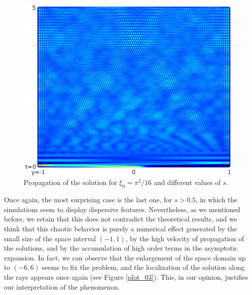 \documentclass[10pt]{article}
\begin{document}
\begin{figure}[!h]
\begin{minipage}{0.3\textwidth}
		\includegraphics[scale=0.35]{./figures/plot_frac_schrodinger2_09_1}
	\end{minipage}	
	\caption{Propagation of the solution for $\xi_0 = \pi^2/16$ and different values of $s$.}\label{plot_02}
\end{figure} 

Once again, the most surprising case is the last one, for $s>0.5$, in which the simulations seem to display dispersive features. Nevertheless, as we mentioned before, we retain that this does not contradict the theoretical results, and we think that this chaotic behavior is purely a numerical effect generated by the small size of the space interval $(-1,1)$, by the high velocity of propagation of the solutions, and by the accumulation of high order terms in the asymptotic expansion. In fact, we can observe that the enlargement of the space domain up to $(-6,6)$ seems to fix the problem, and the localization of the solution along the rays appears once again (see Figure \ref{plot_03}). This, in our opinion, justifies our interpretation of the phenomenon.
\end{document}
